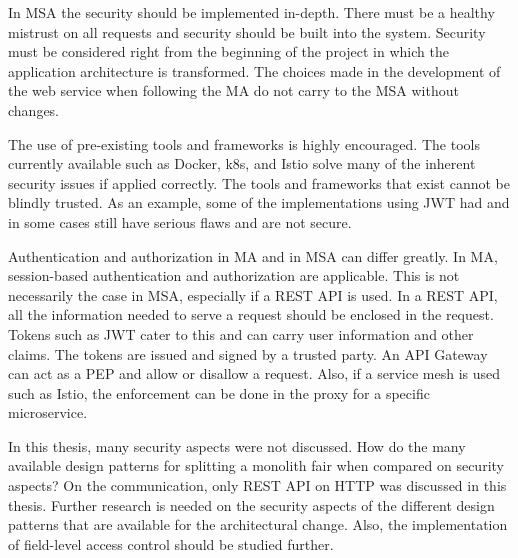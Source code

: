 \begin{sloppypar}
    In MSA the security should be implemented in-depth. There must be a healthy
    mistrust on all requests and security should be built into the system.
    Security must be considered right from the beginning of the project in which
    the application architecture is transformed. The choices made in the
    development of the web service when following the MA do not carry to the MSA
    without changes.
\end{sloppypar}
\begin{sloppypar}
    The use of pre-existing tools and frameworks is highly encouraged. The tools
    currently available such as Docker, k8s, and Istio solve many of the
    inherent security issues if applied correctly. The tools and frameworks that
    exist cannot be blindly trusted. As an example, some of the implementations
    using JWT had and in some cases still have serious flaws and are not secure.
\end{sloppypar}
\begin{sloppypar}
    Authentication and authorization in MA and in MSA can differ greatly. In MA,
    session-based authentication and authorization are applicable. This is not
    necessarily the case in MSA, especially if a REST API is used. In a REST
    API, all the information needed to serve a request should be enclosed in the
    request. Tokens such as JWT cater to this and can carry user information and
    other claims. The tokens are issued and signed by a trusted party. An API
    Gateway can act as a PEP and allow or disallow a request. Also, if a service
    mesh is used such as Istio, the enforcement can be done in the proxy for a
    specific microservice.
\end{sloppypar}
\begin{sloppypar}
    In this thesis, many security aspects were not discussed. How do the many
    available design patterns for splitting a monolith fair when compared on
    security aspects? On the communication, only REST API on HTTP was discussed
    in this thesis. Further research is needed on the security aspects of the
    different design patterns that are available for the architectural change.
    Also, the implementation of field-level access control should be studied
    further.
\end{sloppypar}


